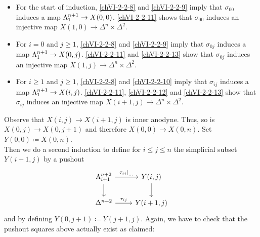         \begin{itemize}
            \item 
                For the start of induction, \ref{chVI-2-2-8} and \ref{chVI-2-2-9} imply that $\sigma_{0 0}$ induces a map $\Lambda^{n+1}_{1} \to X(0, 0)$. \ref{chVI-2-2-11} shows that $\sigma_{0 0}$ induces an injective map $X(1, 0) \to \Delta^n \times \Delta^2$.
            \item 
                For $i = 0$ and $j \geq 1$, \ref{chVI-2-2-8} and \ref{chVI-2-2-9} imply that $\sigma_{0 j}$ induces a map $\Lambda^{n+1}_{1} \to X(0, j)$. \ref{chVI-2-2-11} and \ref{chVI-2-2-13} show that $\sigma_{0 j}$ induces an injective map $X(1, j) \to \Delta^n \times \Delta^2$.
            \item 
                For $i \geq 1$ and $j \geq 1$, \ref{chVI-2-2-8} and \ref{chVI-2-2-10} imply that $\sigma_{i j}$ induces a map $\Lambda^{n+1}_{1} \to X(i, j)$. \ref{chVI-2-2-11}, \ref{chVI-2-2-12} and \ref{chVI-2-2-13} show that $\sigma_{i j}$ induces an injective map $X(i + 1, j) \to \Delta^n \times \Delta^2$.
        \end{itemize}
        Observe that $X(i, j) \to X(i + 1, j)$ is inner anodyne. Thus, so is $X(0, j) \to X(0, j + 1)$ and therefore $X(0, 0) \to X(0, n)$. Set $Y(0, 0) \coloneq X(0, n)$.\\
        Then we do a second induction to define for $i \leq j \leq n$ the simplicial subset $Y(i + 1, j)$ by a pushout
        \begin{equation*}
            \begin{tikzcd}
                \horn{n+2}{i+1} \arrow[d] \arrow[r, "{\tau_{i j}|}_{\ldots}"] & Y(i, j) \arrow[d] \\
                \Delta^{n+2} \arrow[r, "\tau_{i j}"] & Y(i + 1, j)
            \end{tikzcd}
        \end{equation*}
        and by defining $Y(0, j + 1) \coloneq Y(j + 1, j)$. Again, we have to check that the pushout squares above actually exist as claimed:

